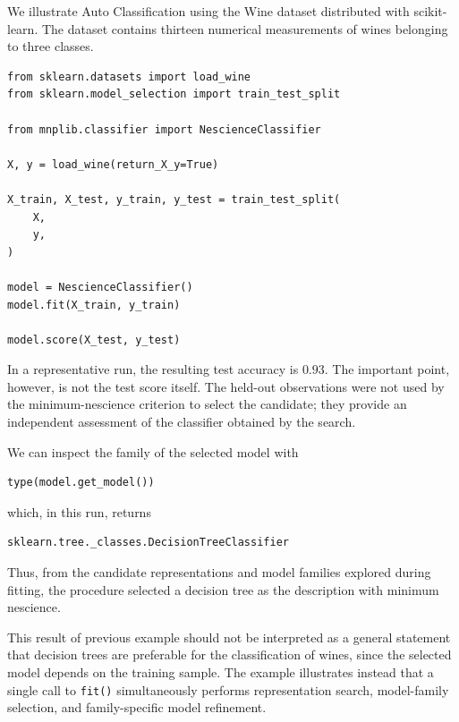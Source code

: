\begin{example}
\label{ex:auto_classifier_wine}

We illustrate Auto Classification using the Wine dataset distributed with scikit-learn. The dataset contains thirteen numerical measurements of wines belonging to three classes.

\begin{sourcecode}
{\scriptsize
\begin{verbatim}
from sklearn.datasets import load_wine
from sklearn.model_selection import train_test_split

from mnplib.classifier import NescienceClassifier

X, y = load_wine(return_X_y=True)

X_train, X_test, y_train, y_test = train_test_split(
    X,
    y,
)

model = NescienceClassifier()
model.fit(X_train, y_train)

model.score(X_test, y_test)
\end{verbatim}}
\end{sourcecode}

In a representative run, the resulting test accuracy is $0.93$. The important point, however, is not the test score itself. The held-out observations were not used by the minimum-nescience criterion to select the candidate; they provide an independent assessment of the classifier obtained by
the search.

We can inspect the family of the selected model with

\begin{sourcecode}
{\scriptsize
\begin{verbatim}
type(model.get_model())
\end{verbatim}}
\end{sourcecode}

which, in this run, returns

\begin{verbatim}
sklearn.tree._classes.DecisionTreeClassifier
\end{verbatim}

Thus, from the candidate representations and model families explored during fitting, the procedure selected a decision tree as the description with minimum nescience.
\end{example}

This result of previous example should not be interpreted as a general statement that decision trees are preferable for the classification of wines, since the selected model depends on the training sample. The example illustrates instead that a single call to \texttt{fit()} simultaneously performs representation search, model-family selection, and family-specific model refinement.


